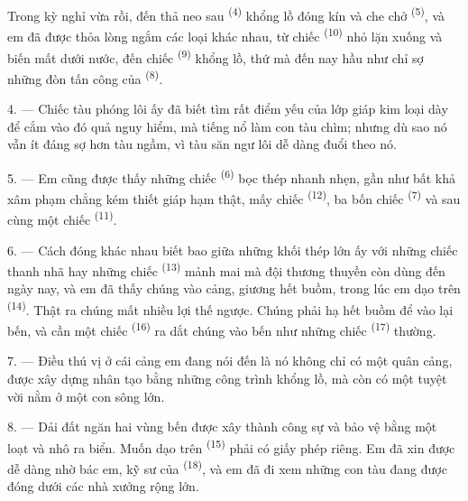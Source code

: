 Trong kỳ nghỉ vừa rồi,  đến thả neo sau 
\textsuperscript{(4)} khổng lồ đóng kín và che chở 
\textsuperscript{(5)}, và em đã được thỏa lòng ngắm các loại  khác
nhau, từ chiếc  \textsuperscript{(10)} nhỏ lặn xuống và biến mất dưới
nước, đến chiếc  \textsuperscript{(9)} khổng lồ, thứ mà đến nay
hầu như chỉ sợ những đòn tấn công của  \textsuperscript{(8)}.

\VUsaut{3.0mm}
\VUsaut{3.0mm}

4. --- Chiếc tàu phóng lôi ấy đã biết tìm rất  điểm yếu của lớp giáp kim
loại dày để cắm vào đó quả  nguy hiểm, mà tiếng nổ làm con tàu chìm;
nhưng dù sao nó vẫn ít đáng sợ hơn tàu ngầm, vì tàu săn ngư lôi dễ dàng đuổi theo nó.

5. --- Em cũng được thấy những chiếc  \textsuperscript{(6)} bọc
thép nhanh nhẹn, gần như bất khả xâm phạm chẳng kém thiết giáp hạm thật, mấy chiếc
 \textsuperscript{(12)}, ba bốn chiếc 
\textsuperscript{(7)} và sau cùng một chiếc  \textsuperscript{(11)}.

6. --- Cách đóng khác nhau biết bao giữa những khối thép lớn ấy với những chiếc
 thanh nhã hay những chiếc 
\textsuperscript{(13)} mảnh mai mà đội thương thuyền còn dùng đến ngày nay, và em đã thấy
chúng vào cảng, giương hết buồm, trong lúc em dạo trên 
\textsuperscript{(14)}. Thật ra chúng mất nhiều lợi thế   ngược.
Chúng phải hạ hết buồm để vào lại bến, và cần một chiếc 
\textsuperscript{(16)} ra dắt chúng vào bến như những chiếc 
\textsuperscript{(17)} thường.

\VUsaut{3.0mm}
\VUsaut{3.0mm}

7. --- Điều thú vị ở cái cảng em đang nói đến là nó không chỉ có một quân cảng, được xây
dựng nhân tạo bằng những công trình khổng lồ, mà còn có một  tuyệt
vời nằm ở  một con sông lớn.

8. --- Dải đất ngăn hai vùng bến được xây thành công sự và bảo vệ bằng một loạt
 và  nhô ra biển. Muốn dạo trên 
\textsuperscript{(15)} phải có giấy phép riêng. Em đã xin được dễ dàng nhờ bác em, kỹ sư
của  \textsuperscript{(18)}, và em đã đi xem những con tàu đang
được đóng dưới các nhà xưởng rộng lớn.

